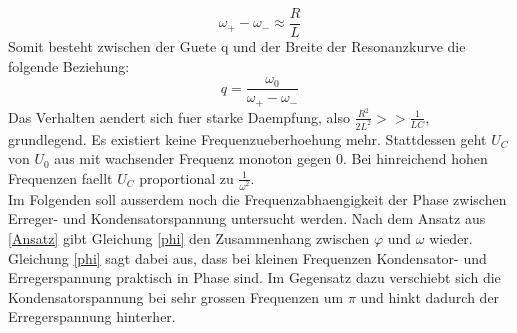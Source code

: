 \documentclass[titlepage=firstcover, captions=tableheading]{scrartcl}
\begin{document}
\begin{equation}
    \omega_+-\omega_-\approx \frac{R}{L}\nonumber
\end{equation}
Somit besteht zwischen der Guete q und der Breite der Resonanzkurve die folgende Beziehung:
\begin{equation}
    q=\frac{\omega_0}{\omega_+-\omega_-}\nonumber
\end{equation}
Das Verhalten aendert sich fuer starke Daempfung, also $\frac{R^2}{2L^2}>>\frac{1}{LC}$, grundlegend. Es existiert keine Frequenzueberhoehung mehr. Stattdessen geht $U_C$ von $U_0$ aus mit wachsender Frequenz monoton gegen 0. Bei hinreichend hohen Frequenzen faellt $U_C$ proportional zu $\frac{1}{\omega^2}$.\\
Im Folgenden soll ausserdem noch die Frequenzabhaengigkeit der Phase zwischen Erreger- und Kondensatorspannung untersucht werden. Nach dem Ansatz aus \ref{Ansatz} gibt Gleichung \ref{phi} den Zusammenhang zwischen $\varphi$ und $\omega$ wieder. Gleichung \ref{phi} sagt dabei aus, dass bei kleinen Frequenzen Kondensator- und Erregerspannung praktisch in Phase sind. Im Gegensatz dazu verschiebt sich die Kondensatorspannung bei sehr grossen Frequenzen um $\pi$ und hinkt dadurch der Erregerspannung hinterher. 
\end{document}

